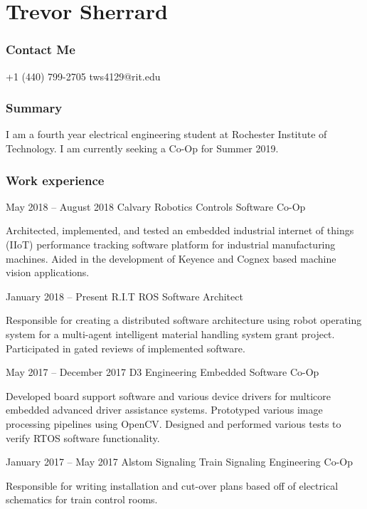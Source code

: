 \documentclass{tccv}
\begin{document}
\part{Trevor Sherrard}
\section{Contact Me}
\begin{eventlist}
    {+1 (440) 799-2705}
    {tws4129@rit.edu}
    
\end{eventlist}

\section{Summary}
I am a fourth year electrical engineering student at Rochester Institute of Technology. I am currently seeking a Co-Op for Summer 2019.

\section{Work experience}

\begin{eventlist}

\item{May 2018 -- August 2018}
     {Calvary Robotics}
     {Controls Software Co-Op}

Architected, implemented, and tested an embedded industrial internet of things (IIoT) performance tracking software platform for industrial manufacturing machines. Aided in the development of Keyence and Cognex based machine vision applications.

\item{January 2018 -- Present}
     {R.I.T}
     {ROS Software Architect}
     
Responsible for creating a distributed software architecture using robot operating system for a multi-agent intelligent material handling system grant project. Participated in gated reviews of implemented software.   

\item{May 2017 -- December 2017}
     {D3 Engineering}
     {Embedded Software Co-Op}
     
Developed board support software and various device drivers for multicore embedded advanced driver assistance systems. Prototyped various image processing pipelines using OpenCV. Designed and performed various tests to verify RTOS software functionality.

\item{January 2017 -- May 2017}
     {Alstom Signaling}
     {Train Signaling Engineering Co-Op}

Responsible for writing installation and cut-over plans based off of electrical schematics for train control rooms.

\end{eventlist}
\end{document}
